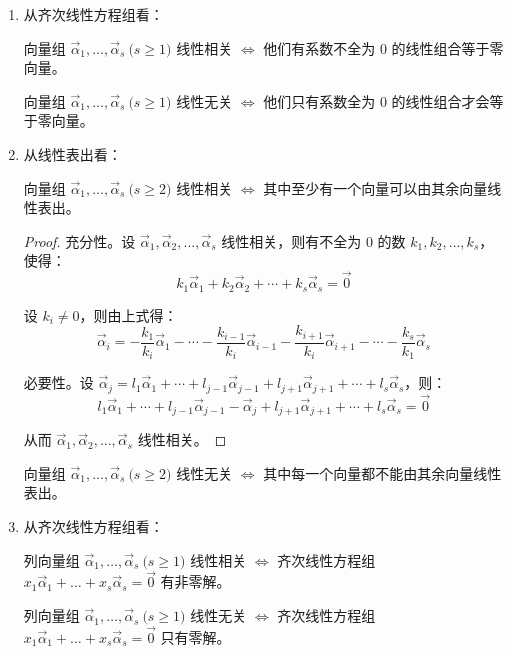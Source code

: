 \begin{enumerate}
	\item 从齐次线性方程组看：

	向量组 $\vec \alpha_1, \ldots, \vec \alpha_s \pod{s \ge 1}$ 线性相关 $\Longleftrightarrow$ 他们有系数不全为 $0$ 的线性组合等于零向量。

	向量组 $\vec \alpha_1, \ldots, \vec \alpha_s \pod{s \ge 1}$ 线性无关 $\Longleftrightarrow$ 他们只有系数全为 $0$ 的线性组合才会等于零向量。

	\item 从线性表出看：

	向量组 $\vec \alpha_1, \ldots, \vec \alpha_s \pod{s \ge 2}$ 线性相关 $\Longleftrightarrow$ 其中至少有一个向量可以由其余向量线性表出。

	\begin{proof}
		充分性。设 $\vec \alpha_1, \vec \alpha_2, \ldots, \vec \alpha_s$ 线性相关，则有不全为 $0$ 的数 $k_1, k_2, \ldots, k_s$，使得：
		$$
		k_1 \vec \alpha_1 + k_2 \vec \alpha_2 + \cdots + k_s \vec \alpha_s = \vec 0
		$$

		设 $k_i \ne 0$，则由上式得：
		$$
		\vec \alpha_i = - \frac{k_1}{k_i} \vec \alpha_1 - \cdots - \frac{k_{i - 1}}{k_i} \vec \alpha_{i - 1} - \frac{k_{i + 1}}{k_i} \vec \alpha_{i + 1} - \cdots - \frac{k_s}{k_1} \vec \alpha_s
		$$

		\bigskip

		必要性。设 $\vec \alpha_j = l_1 \vec \alpha_1 + \cdots + l_{j - 1} \vec \alpha_{j - 1} + l_{j + 1} \vec \alpha_{j + 1} + \cdots + l_s \vec \alpha_s$，则：
		$$
		l_1 \vec \alpha_1 + \cdots + l_{j - 1} \vec \alpha_{j - 1} - \vec \alpha_j + l_{j + 1} \vec \alpha_{j + 1} + \cdots + l_s \vec \alpha_s = \vec 0
		$$

		从而 $\vec \alpha_1, \vec \alpha_2, \ldots, \vec \alpha_s$ 线性相关。
	\end{proof}

	向量组 $\vec \alpha_1, \ldots, \vec \alpha_s \pod{s \ge 2}$ 线性无关 $\Longleftrightarrow$ 其中每一个向量都不能由其余向量线性表出。

	\item 从齐次线性方程组看：

	列向量组 $\vec \alpha_1, \ldots, \vec \alpha_s \pod{s \ge 1}$ 线性相关 $\Longleftrightarrow$ 齐次线性方程组 $x_1 \vec \alpha_1 + \ldots + x_s \vec \alpha_s = \vec 0$ 有非零解。

	列向量组 $\vec \alpha_1, \ldots, \vec \alpha_s \pod{s \ge 1}$ 线性无关 $\Longleftrightarrow$ 齐次线性方程组 $x_1 \vec \alpha_1 + \ldots + x_s \vec \alpha_s = \vec 0$ 只有零解。


\end{enumerate}
